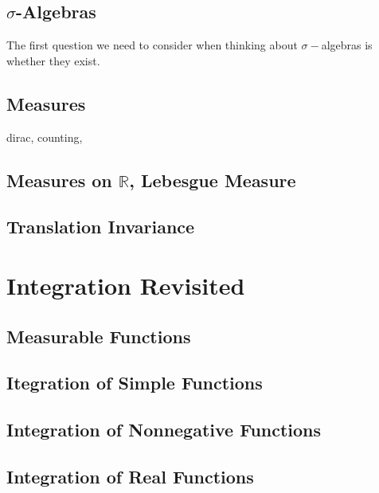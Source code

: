 \documentclass{article}
\newcommand{\R}{\mathbb{R}}
\theoremstyle{definition}
\begin{document}
\subsection{$ \sigma $-Algebras}
The first question we need to consider when thinking about $\sigma-$algebras is whether they exist. 

\subsection{Measures}

	
	
	
	dirac, counting, 
	\subsection{Measures on $ \R $, Lebesgue Measure}
	\subsection{Translation Invariance}
	\section{Integration Revisited}
	\subsection{Measurable Functions}
	\subsection{Itegration of Simple Functions}
	\subsection{Integration of Nonnegative Functions}
	\subsection{Integration of Real Functions}
	
\end{document}
